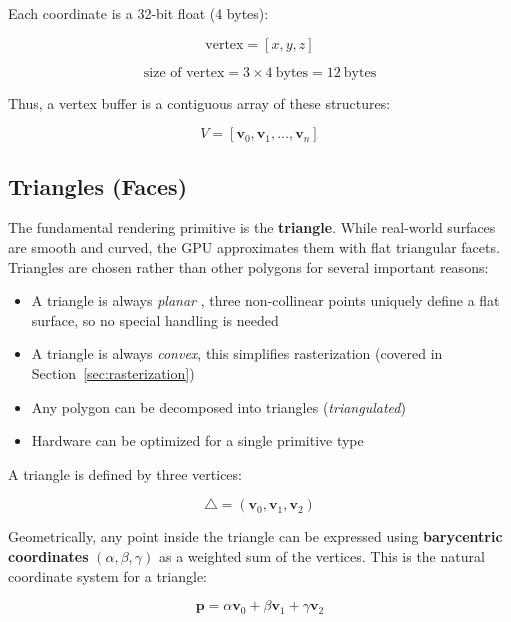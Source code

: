 \documentclass[11pt]{article}
\begin{document}
Each coordinate is a 32-bit float (4 bytes):

\begin{equation}
    \text{vertex} = [x, y, z]
\end{equation}

\begin{equation}
    \text{size of vertex} = 3 \times 4\ \text{bytes} = 12\ \text{bytes}
\end{equation}

Thus, a vertex buffer is a contiguous array of these structures:

\begin{equation}
    V = [\mathbf{v}_0, \mathbf{v}_1, \dots, \mathbf{v}_n]
\end{equation}


\subsection{Triangles (Faces)}

The fundamental rendering primitive is the \textbf{triangle}. While real-world surfaces are smooth and curved, the GPU approximates them with flat triangular facets. Triangles are chosen rather than other polygons for several important reasons:
\begin{itemize}
    \item A triangle is always \emph{planar} , three non-collinear points uniquely define a flat surface, so no special handling is needed
    \item A triangle is always \emph{convex}, this simplifies rasterization (covered in Section~\ref{sec:rasterization})
    \item Any polygon can be decomposed into triangles (\emph{triangulated})
    \item Hardware can be optimized for a single primitive type
\end{itemize}

A triangle is defined by three vertices:

\begin{equation}
    \triangle = (\mathbf{v}_0, \mathbf{v}_1, \mathbf{v}_2)
\end{equation}

Geometrically, any point inside the triangle can be expressed using \textbf{barycentric coordinates} $(\alpha, \beta, \gamma)$ as a weighted sum of the vertices. This is the natural coordinate system for a triangle:

\begin{equation}
    \mathbf{p} = \alpha \mathbf{v}_0 + \beta \mathbf{v}_1 + \gamma \mathbf{v}_2
\end{equation}
\end{document}
